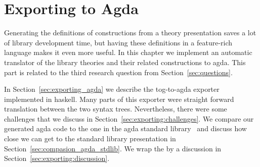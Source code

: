 \chapter{Exporting to Agda}
\label{ch:export}


Generating the definitions of constructions from a theory presentation saves a lot of library development time, but having these definitions in a feature-rich language makes it even more useful. In this chapter we implement an automatic translator of the library theories and their related constructions to agda. This part is related to the third research question from Section~\ref{sec:questions}. 

In Section~\ref{sec:exporting_agda} we describe the tog-to-agda exporter implemented in haskell. Many parts of this exporter were straight forward translation between the two syntax trees. Nevertheless, there were some challenges that we discuss in Section~\ref{sec:exporting:challenges}. We compare our generated agda code to the one in the agda standard library~\cite{agda_stdlib} and discuss how close we can get to the standard library presentation in Section~\ref{sec:compasion_agda_stdlib}. 
We wrap the by a discussion in Section~\ref{sec:exporting:discussion}. 

\begin{comment}
One of the problems we highlight here is how design decisions lead to different presentations of the same theory, forcing developers to rewrite the same mathematical knowledge in different ways. In this chapter, we investigate the following question
\begin{itemize}
\item Given the tog abstract representation, can we export to formal systems with more complex meta theory and design decision. 
\end{itemize}
\end{comment}

